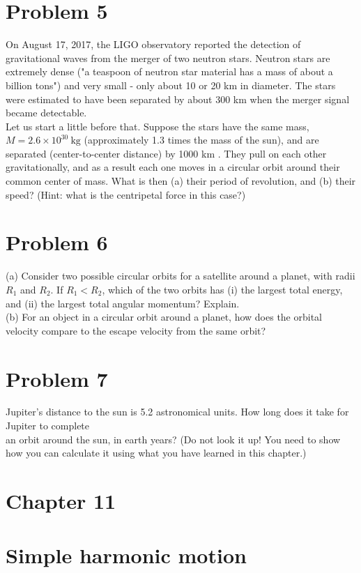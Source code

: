 \documentclass[10pt]{article}
\begin{document}
\section*{Problem 5}
On August 17, 2017, the LIGO observatory reported the detection of gravitational waves from the merger of two neutron stars. Neutron stars are extremely dense ("a teaspoon of neutron star material has a mass of about a billion tons") and very small - only about 10 or 20 km in diameter. The stars were estimated to have been separated by about 300 km when the merger signal became detectable.\\
Let us start a little before that. Suppose the stars have the same mass, $M=2.6 \times 10^{30} \mathrm{~kg}$ (approximately 1.3 times the mass of the sun), and are separated (center-to-center distance) by 1000 km . They pull on each other gravitationally, and as a result each one moves in a circular orbit around their common center of mass. What is then (a) their period of revolution, and (b) their speed? (Hint: what is the centripetal force in this case?)

\section*{Problem 6}
(a) Consider two possible circular orbits for a satellite around a planet, with radii $R_{1}$ and $R_{2}$. If $R_{1}<R_{2}$, which of the two orbits has (i) the largest total energy, and (ii) the largest total angular momentum? Explain.\\
(b) For an object in a circular orbit around a planet, how does the orbital velocity compare to the escape velocity from the same orbit?

\section*{Problem 7}
Jupiter's distance to the sun is 5.2 astronomical units. How long does it take for Jupiter to complete\\
an orbit around the sun, in earth years? (Do not look it up! You need to show how you can calculate it using what you have learned in this chapter.)

\section*{Chapter 11}
\section*{Simple harmonic motion}
\end{document}
